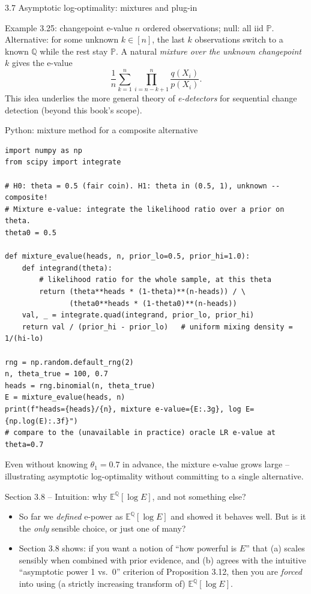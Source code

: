\documentclass[aspectratio=169,10pt]{beamer}
\newcommand{\PP}{\mathbb{P}}
\newcommand{\QQ}{\mathbb{Q}}
\newcommand{\EE}{\mathbb{E}}
\begin{document}
\begin{frame}[allowframebreaks]{3.7 Asymptotic log-optimality: mixtures and plug-in}
  \begin{exampleblock}{Example 3.25: changepoint e-value}
    $n$ ordered observations; null: all iid $\PP$. Alternative: for some unknown $k\in[n]$, the last $k$ observations switch to a known $\QQ$ while the rest stay $\PP$. A natural \emph{mixture over the unknown changepoint} $k$ gives the e-value
    \[
      \frac{1}{n}\sum_{k=1}^n \prod_{i=n-k+1}^n \frac{q(X_i)}{p(X_i)}.
    \]
    This idea underlies the more general theory of \emph{e-detectors} for sequential change detection (beyond this book's scope).
  \end{exampleblock}
\end{frame}

\begin{frame}[fragile]{Python: mixture method for a composite alternative}
  \begin{lstlisting}
import numpy as np
from scipy import integrate

# H0: theta = 0.5 (fair coin). H1: theta in (0.5, 1), unknown -- composite!
# Mixture e-value: integrate the likelihood ratio over a prior on theta.
theta0 = 0.5

def mixture_evalue(heads, n, prior_lo=0.5, prior_hi=1.0):
    def integrand(theta):
        # likelihood ratio for the whole sample, at this theta
        return (theta**heads * (1-theta)**(n-heads)) / \
               (theta0**heads * (1-theta0)**(n-heads))
    val, _ = integrate.quad(integrand, prior_lo, prior_hi)
    return val / (prior_hi - prior_lo)   # uniform mixing density = 1/(hi-lo)

rng = np.random.default_rng(2)
n, theta_true = 100, 0.7
heads = rng.binomial(n, theta_true)
E = mixture_evalue(heads, n)
print(f"heads={heads}/{n}, mixture e-value={E:.3g}, log E={np.log(E):.3f}")
# compare to the (unavailable in practice) oracle LR e-value at theta=0.7
  \end{lstlisting}
  Even without knowing $\theta_1=0.7$ in advance, the mixture e-value grows large -- illustrating asymptotic log-optimality without committing to a single alternative.
\end{frame}

\begin{frame}{Section 3.8 -- Intuition: why $\EE^\QQ[\log E]$, and not something else?}
  \begin{itemize}
    \item So far we \emph{defined} e-power as $\EE^\QQ[\log E]$ and showed it behaves well. But is it the \emph{only} sensible choice, or just one of many?
    \item Section 3.8 shows: if you want a notion of ``how powerful is $E$'' that (a) scales sensibly when combined with prior evidence, and (b) agrees with the intuitive ``asymptotic power 1 vs.\ 0'' criterion of Proposition 3.12, then you are \emph{forced} into using (a strictly increasing transform of) $\EE^\QQ[\log E]$.
  \end{itemize}
\end{frame}
\end{document}
